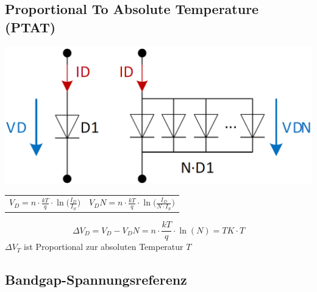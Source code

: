\subsection{Proportional To Absolute Temperature (PTAT)}

\begin{minipage}[c]{0.28\columnwidth}
    \includegraphics[width=\columnwidth]{images/ptat.png}
\end{minipage}
\hfill
\begin{minipage}[c]{0.7\columnwidth}

    \begin{tabular}{@{}c c@{}}
        $V_D = n \cdot \frac{k T}{q} \cdot \ln \Big( \frac{I_D}{I_S} \Big)$ & 
        $V_DN = n \cdot \frac{k T}{q} \cdot \ln \Big( \frac{I_D}{N \cdot I_S} \Big)$
    \end{tabular}

    $$ \boxed{ \Delta V_D = V_D - V_DN = n \cdot \frac{k T}{q} \cdot \ln(N)  = TK \cdot T }$$
    \textrightarrow $\Delta V_T$ ist Proportional zur absoluten Temperatur $T$
\end{minipage}


\subsection{Bandgap-Spannungsreferenz}

